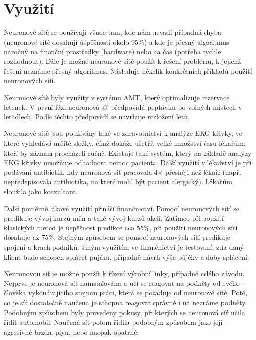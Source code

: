\documentclass[11pt,twoside,a4paper]{book}
\begin{document}
\section{Využití}
Neuronové sítě se používají všude tam, kde nám nevadí případná chyba (neuronové sítě dosahují úspěšnosti okolo 95\%) a kde je přesný algoritmus náročný na finanční prostředky (hardware) nebo na čas (potřeba rychle rozhodnout). Dále je možné neuronové sítě použít k řešení problému, k jejichž řešení neznáme přesný algoritmus. Následuje několik konkrétních příkladů použití neuronových sítí.

Neuronové sítě byly využity v systému AMT, který optimalizuje rezervace letenek. V první fázi neuronová síť předpovídá poptávku po volných místech v letadlech. Podle těchto předpovědí se navrhuje rozložení letů.\cite{kacenka}

Neuronové sítě jsou používány také ve zdravotnictví k analýze EKG křivky, ve které vyhledává určité složky, čímž dokáže ušetřit velké množství času lékařům, kteří by záznam procházeli ručně. Existuje také systém, který na základě analýzy EKG křivky umožňuje odhadnout nemoc pacienta. Další využití v lékařství je při podávání antibiotik, kdy neuronová síť pracovala 4\begin{math}\times\end{math} přesněji než lékaři (např. nepředepisovala antibiotika, na které mohl být pacient alergický). Lékařům sloužila jako konzultant.\cite{kacenka}

Další poměrně lákavé využití přináší finančnictví. Pomocí neuronových sítí se predikuje vývoj kurzů měn a také vývoj kurzů akcií. Zatímco při použití klasických metod je úspěšnost predikce cca 55\%, při použití neuronových sítí dosahuje až 75\%. Stejným způsobem se pomocí neuronových sítí predikuje spojení a krach podniků. Jiným využitím ve finančnictví je testování, zda daný klient bude schopen splácet půjčku, případně návrh výše půjčky a doby splácení.\cite{kacenka}

Neuronovou síť je možné použít k řízení výrobní linky, případně celého závodu. Nejprve je neuronová síť nainstalována a učí se reagovat na podněty od svého  - člověka vykonávajícího stejnou práci, která se požaduje od neuronové sítě. Poté, co je síť dostatečně naučena je schopna reagovat správně i na neznáme podněty. Podobným způsobem byly provedeny pokusy, při kterých se neuronová síť učila řídit automobil. Naučená síť potom řídila podobným způsobem jako její  - agresivně brzda, plyn, nebo naopak opatrně.\cite{kacenka}
\end{document}
